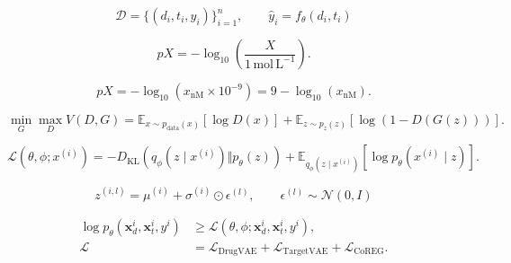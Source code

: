 \begin{equation}
\mathcal{D}=\{(d_i,t_i,y_i)\}_{i=1}^{n},
\qquad
\widehat{y}_i=f_\theta(d_i,t_i)
\label{eq:dataset}
\end{equation}

\begin{equation}
pX=-\log_{10}\!\left(\frac{X}{1\,\mathrm{mol\,L^{-1}}}\right).
\label{eq:log-affinity}
\end{equation}

\begin{equation}
pX=-\log_{10}(x_{\mathrm{nM}}\times10^{-9})
=9-\log_{10}(x_{\mathrm{nM}}).
\label{eq:nm-affinity}
\end{equation}

\begin{equation}
\min_G\max_D V(D,G)=
\mathbb{E}_{x\sim p_{\mathrm{data}}(x)}[\log D(x)]
+\mathbb{E}_{z\sim p_z(z)}[\log(1-D(G(z)))].
\label{eq:gan-minimax}
\end{equation}

\begin{equation}
\mathcal{L}(\theta,\phi;x^{(i)})
=-D_{\mathrm{KL}}\!\left(q_\phi(z\mid x^{(i)})\Vert p_\theta(z)\right)
+\mathbb{E}_{q_\phi(z\mid x^{(i)})}
[\log p_\theta(x^{(i)}\mid z)].
\label{eq:vae-elbo}
\end{equation}

\begin{equation}
z^{(i,l)}=\mu^{(i)}+\sigma^{(i)}\odot\epsilon^{(l)},
\qquad \epsilon^{(l)}\sim\mathcal{N}(0,I)
\label{eq:vae-reparameterization}
\end{equation}

\begin{equation}
\begin{aligned}
\log p_\theta(\mathbf{x}_d^i,\mathbf{x}_t^i,y^i)
&\geq \mathcal{L}(\theta,\phi;\mathbf{x}_d^i,\mathbf{x}_t^i,y^i),\\
\mathcal{L}
&=\mathcal{L}_{\mathrm{DrugVAE}}
+\mathcal{L}_{\mathrm{TargetVAE}}
+\mathcal{L}_{\mathrm{CoREG}}.
\end{aligned}
\label{eq:covae-elbo}
\end{equation}

